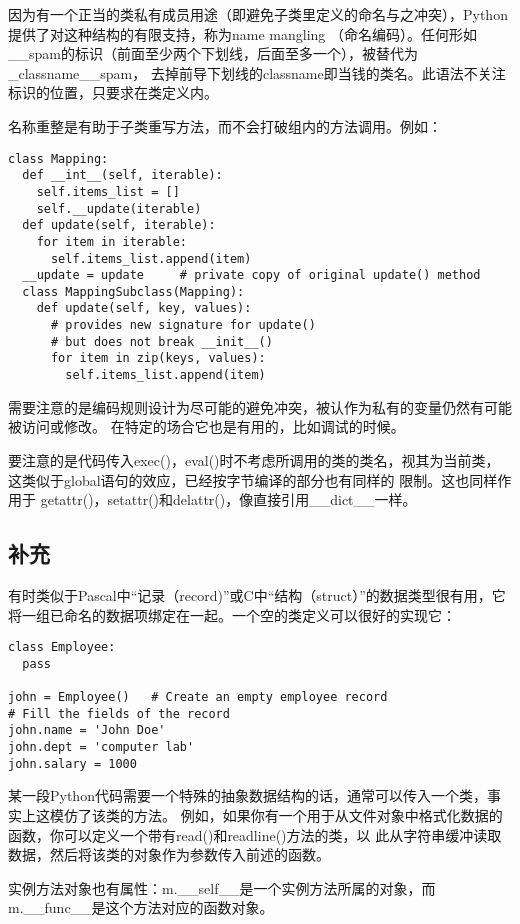 \documentclass[UTF8]{ctexart}
\begin{document}
因为有一个正当的类私有成员用途（即避免子类里定义的命名与之冲突），Python提供了对这种结构的有限支持，称为name mangling
（命名编码）。任何形如\_\_spam的标识（前面至少两个下划线，后面至多一个），被替代为\_classname\_\_spam，
去掉前导下划线的classname即当钱的类名。此语法不关注标识的位置，只要求在类定义内。

名称重整是有助于子类重写方法，而不会打破组内的方法调用。例如：
\begin{verbatim}
class Mapping:
  def __int__(self, iterable):
    self.items_list = []
    self.__update(iterable)
  def update(self, iterable):
    for item in iterable:
      self.items_list.append(item)
  __update = update     # private copy of original update() method
  class MappingSubclass(Mapping):
    def update(self, key, values):
      # provides new signature for update()
      # but does not break __init__()
      for item in zip(keys, values):
        self.items_list.append(item)
\end{verbatim}

需要注意的是编码规则设计为尽可能的避免冲突，被认作为私有的变量仍然有可能被访问或修改。
在特定的场合它也是有用的，比如调试的时候。

要注意的是代码传入exec()，eval()时不考虑所调用的类的类名，视其为当前类，这类似于global语句的效应，已经按字节编译的部分也有同样的
限制。这也同样作用于 getattr()，setattr()和delattr()，像直接引用\_\_dict\_\_一样。

\subsection{补充}
有时类似于Pascal中``记录（record)''或C中``结构（struct）''的数据类型很有用，它将一组已命名的数据项绑定在一起。一个空的类定义可以很好的实现它：
\begin{verbatim}
class Employee:
  pass

john = Employee()   # Create an empty employee record
# Fill the fields of the record
john.name = 'John Doe'
john.dept = 'computer lab'
john.salary = 1000
\end{verbatim}

某一段Python代码需要一个特殊的抽象数据结构的话，通常可以传入一个类，事实上这模仿了该类的方法。
例如，如果你有一个用于从文件对象中格式化数据的函数，你可以定义一个带有read()和readline()方法的类，以
此从字符串缓冲读取数据，然后将该类的对象作为参数传入前述的函数。

实例方法对象也有属性：m.\_\_self\_\_是一个实例方法所属的对象，而m.\_\_func\_\_是这个方法对应的函数对象。
\end{document}
